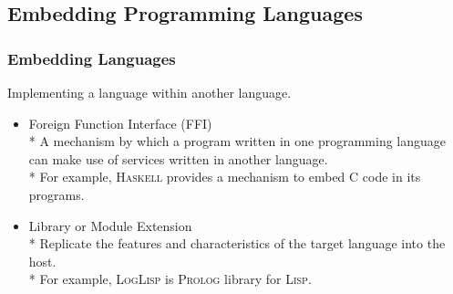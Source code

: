 \documentclass[hideothersubsections, t, aspectratio=1610]{beamer}
\newcommand{\progLang}[1]{\textsc{#1}}
\begin{document}
\subsection{Embedding Programming Languages}

\begin{frame}
\frametitle{Embedding Languages}

Implementing a language within another language.

\begin{itemize}
\item Foreign Function Interface (FFI)
 \\* A mechanism by which a program written in one programming language can make use of services written in another language. 
\\* For example, \progLang{Haskell} provides a mechanism to embed \progLang{C} code in its programs.

\item Library or Module Extension
\\* Replicate the features and characteristics of the target language into the host. 
\\* For example, \progLang{LogLisp} is \progLang{Prolog} library for \progLang{Lisp}. 
\end{itemize}

\end{frame}
\end{document}
